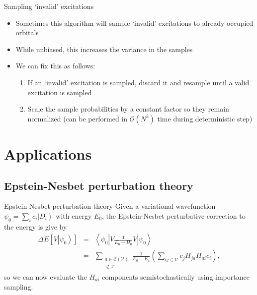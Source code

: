 \documentclass[amsmath]{beamer}
\begin{document}
\begin{frame}{Sampling `invalid' excitations}
\begin{itemize}
	\item Sometimes this algorithm will sample `invalid' excitations to already-occupied orbitals
	\item While unbiased, this increases the variance in the samples
	\item We can fix this as follows:
	\begin{enumerate}
		\item If an `invalid' excitation is sampled, discard it and resample until a valid excitation is sampled
		\item Scale the sample probabilities by a constant factor so they remain normalized (can be performed in $\mathcal{O}(N^3)$ time during deterministic step)
	\end{enumerate}
\end{itemize}	
\end{frame}

\section{Applications}
\subsection{Epstein-Nesbet perturbation theory}
\begin{frame}{Epstein-Nesbet perturbation theory}
Given a variational wavefunction $\psi_0=\sum_i c_i \left|D_i\right\rangle$ with energy $E_0$, the Epstein-Nesbet perturbative correction to the energy is give by
\begin{eqnarray}
	\Delta E\left[V\left|\psi_0\right\rangle\right] &=& \left\langle \psi_0 \left| V \frac{1}{E_0 - H_0} V \right|\psi_0\right\rangle\\
	&=& \sum_{\substack{a\in \mathcal{C}(\mathcal{V})\\\notin \mathcal{V}}} \frac{1}{E_0 - E_a} \left(\sum_{ij\in\mathcal{V}} c_j H_{ja} H_{ai} c_i\right),
\end{eqnarray}
so we can now evaluate the $H_{ai}$ components semistochastically using importance sampling.
\end{frame}
\end{document}
